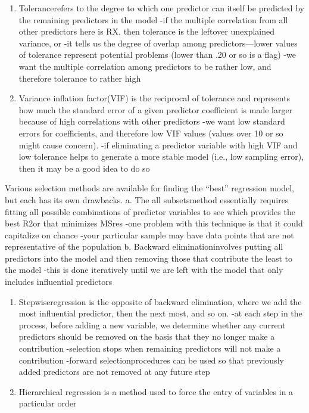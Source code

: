 \documentclass[]{book}
\providecommand{\tightlist}{%
  \setlength{\itemsep}{0pt}\setlength{\parskip}{0pt}}
\theoremstyle{definition}
\theoremstyle{definition}
\theoremstyle{definition}
\theoremstyle{remark}
\begin{document}
\begin{enumerate}
\def\labelenumi{\alph{enumi}.}
\item
  Tolerancerefers to the degree to which one predictor can itself be
  predicted by the remaining predictors in the model -if the multiple
  correlation from all other predictors here is RX, then tolerance is
  the leftover unexplained variance, or -it tells us the degree of
  overlap among predictors---lower values of tolerance represent
  potential problems (lower than .20 or so is a flag) -we want the
  multiple correlation among predictors to be rather low, and therefore
  tolerance to rather high
\item
  Variance inflation factor(VIF) is the reciprocal of tolerance and
  represents how much the standard error of a given predictor
  coefficient is made larger because of high correlations with other
  predictors -we want low standard errors for coefficients, and
  therefore low VIF values (values over 10 or so might cause concern).
  -if eliminating a predictor variable with high VIF and low tolerance
  helps to generate a more stable model (i.e., low sampling error), then
  it may be a good idea to do so
\end{enumerate}

Various selection methods are available for finding the ``best''
regression model, but each has its own drawbacks. a. The all
subsetsmethod essentially requires fitting all possible combinations of
predictor variables to see which provides the best R2or that minimizes
MSres -one problem with this technique is that it could capitalize on
chance -your particular sample may have data points that are not
representative of the population b. Backward eliminationinvolves putting
all predictors into the model and then removing those that contribute
the least to the model -this is done iteratively until we are left with
the model that only includes influential predictors

\begin{enumerate}
\def\labelenumi{\alph{enumi}.}
\setcounter{enumi}{2}
\tightlist
\item
  Stepwiseregression is the opposite of backward elimination, where we
  add the most influential predictor, then the next most, and so on. -at
  each step in the process, before adding a new variable, we determine
  whether any current predictors should be removed on the basis that
  they no longer make a contribution -selection stops when remaining
  predictors will not make a contribution -forward selectionprocedures
  can be used so that previously added predictors are not removed at any
  future step
\item
  Hierarchical regression is a method used to force the entry of
  variables in a particular order
\end{enumerate}
\end{document}
